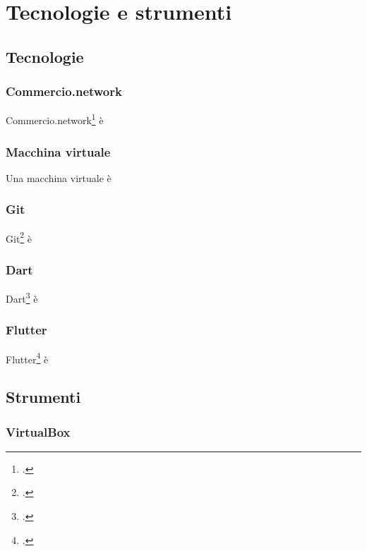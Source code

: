 
\chapter{Tecnologie e strumenti}
\label{cap:tecnologie-strumenti}

\section{Tecnologie}
\subsection*{Commercio.network}

Commercio.network\footcite{site:commercio-network} è

\subsection*{Macchina virtuale}

Una macchina virtuale è

\subsection*{Git}

Git\footcite{site:git} è

\subsection*{Dart}

Dart\footcite{site:dart} è 

\subsection*{Flutter}

Flutter\footcite{site:flutter} è

\section{Strumenti}
\subsection*{VirtualBox}

